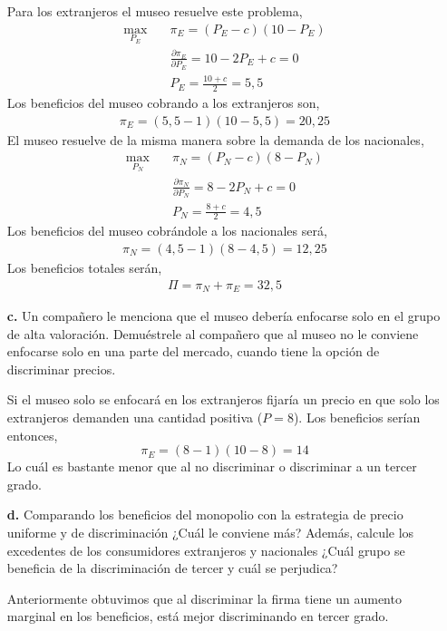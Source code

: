 \begin{itemize}
\begin{solution}
        Para los extranjeros el museo resuelve este problema,
        \begin{align*}
            \max_{P_{E}} \quad & \pi_E = (P_E-c)(10-P_E) \\
            & \frac{\partial  \pi_E}{\partial P_E} = 10 - 2P_E + c = 0 \\
            & P_E = \frac{10+c}{2} = 5,5
        \end{align*}
        Los beneficios del museo cobrando a los extranjeros son, 
        \begin{align*}
            \pi_E = (5,5-1)(10-5,5) = 20,25
        \end{align*}
        El museo resuelve de la misma manera sobre la demanda de los nacionales,
        \begin{align*}
            \max_{P_N} \quad & \pi_N = (P_N-c)(8-P_N) \\
            & \frac{\partial \pi_N}{\partial P_N} = 8-2P_N + c = 0 \\
            & P_N = \frac{8+c}{2} = 4,5
        \end{align*}
        Los beneficios del museo cobrándole a los nacionales será,
        \begin{align*}
            \pi_N = (4,5-1)(8-4,5) = 12,25
        \end{align*}
        Los beneficios totales serán,
        \begin{align*}
            \Pi = \pi_N + \pi_E = 32,5
        \end{align*}
    \end{solution}
    \item[\textbf{c.}] Un compañero le menciona que el museo debería enfocarse solo en el grupo de alta valoración. Demuéstrele al compañero que al museo no le conviene enfocarse solo en una parte del mercado, cuando tiene la opción de discriminar precios. 
    \begin{solution}
        Si el museo solo se enfocará en los extranjeros fijaría un precio en que solo los extranjeros demanden una cantidad positiva ($P = 8$). Los beneficios serían entonces,
        \begin{equation*}
            \pi_E = (8-1)(10-8) = 14
        \end{equation*}
        Lo cuál es bastante menor que al no discriminar o discriminar a un tercer grado. 
    \end{solution}
    \item[\textbf{d.}] Comparando los beneficios del monopolio con la estrategia de precio uniforme y de discriminación ¿Cuál le conviene más? Además, calcule los excedentes de los consumidores extranjeros y nacionales ¿Cuál grupo se beneficia de la discriminación de tercer y cuál se perjudica?
    \begin{solution}
        Anteriormente obtuvimos que al discriminar la firma tiene un aumento marginal en los beneficios, está mejor discriminando en tercer grado. 


\end{solution}
\end{itemize}
